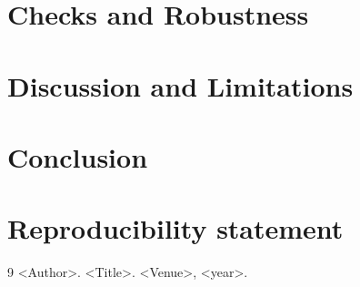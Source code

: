 \documentclass[10pt,twocolumn]{article}
\begin{document}
\section{Checks and Robustness}

\section{Discussion and Limitations}

\section{Conclusion}

\section*{Reproducibility statement}

\begin{thebibliography}{9}
 <Author>. <Title>. <Venue>, <year>.
\end{thebibliography}
\end{document}
